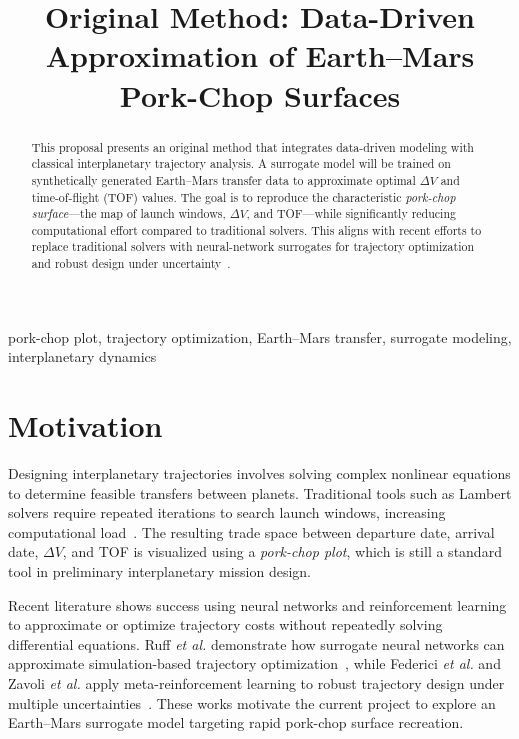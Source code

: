 \documentclass[conference]{IEEEtran}
\begin{document}
	
	\title{Original Method: Data-Driven Approximation of Earth--Mars Pork-Chop Surfaces}
	
	\author{
	}
	
	\maketitle
	
	\begin{abstract}
		This proposal presents an original method that integrates data-driven modeling with classical interplanetary trajectory analysis. A surrogate model will be trained on synthetically generated Earth--Mars transfer data to approximate optimal $\Delta V$ and time-of-flight (TOF) values. The goal is to reproduce the characteristic \emph{pork-chop surface}---the map of launch windows, $\Delta V$, and TOF---while significantly reducing computational effort compared to traditional solvers. This aligns with recent efforts to replace traditional solvers with neural-network surrogates for trajectory optimization and robust design under uncertainty~\cite{ruff2023surrogate,federici2024robust,zavoli2021reinforcement}.
	\end{abstract}
	
	\begin{IEEEkeywords}
		pork-chop plot, trajectory optimization, Earth--Mars transfer, surrogate modeling, interplanetary dynamics
	\end{IEEEkeywords}
	
	\section{Motivation}
	Designing interplanetary trajectories involves solving complex nonlinear equations to determine feasible transfers between planets. Traditional tools such as Lambert solvers require repeated iterations to search launch windows, increasing computational load~\cite{zavoli2021reinforcement}. The resulting trade space between departure date, arrival date, $\Delta V$, and TOF is visualized using a \emph{pork-chop plot}, which is still a standard tool in preliminary interplanetary mission design.
	
	Recent literature shows success using neural networks and reinforcement learning to approximate or optimize trajectory costs without repeatedly solving differential equations. Ruff \textit{et al.} demonstrate how surrogate neural networks can approximate simulation-based trajectory optimization~\cite{ruff2023surrogate}, while Federici \textit{et al.} and Zavoli \textit{et al.} apply meta-reinforcement learning to robust trajectory design under multiple uncertainties~\cite{federici2024robust,zavoli2021reinforcement}. These works motivate the current project to explore an Earth--Mars surrogate model targeting rapid pork-chop surface recreation.
	
\end{document}
